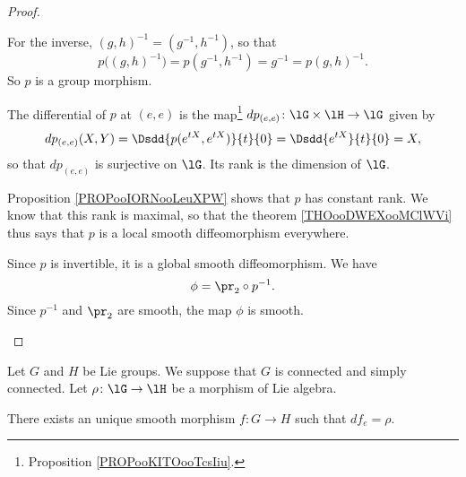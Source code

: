 \begin{proof}
\begin{subproof}
\begin{subproof}
\begin{equation}
			\end{equation}
			For the inverse, \( (g,h)^{-1}=(g^{-1},h^{-1})\), so that
			\begin{equation}
				p\big( (g,h)^{-1}\big)=p(g^{-1},h^{-1})=g^{-1}=p(g,h)^{-1}.
			\end{equation}
			So \( p\) is a group morphism.
		\end{subproof}
		The differential of \( p\) at \( (e,e)\) is the map\footnote{Proposition \ref{PROPooKITOooTcsIiu}.} \( dp_{(e,e)}\colon \lG\times \lH\to \lG\) given by
		\begin{equation}
			dp_{(e,e)}(X,Y)=\Dsdd{ p( e^{tX},  e^{tX}) }{t}{0}=\Dsdd{  e^{tX} }{t}{0}=X,
		\end{equation}
		so that \( dp_{(e,e)}\) is surjective on \( \lG\). Its rank is the dimension of \( \lG\).

		Proposition \ref{PROPooIORNooLeuXPW} shows that \( p\) has constant rank. We know that this rank is maximal, so that the theorem \ref{THOooDWEXooMClWVi} thus says that \( p\) is a local smooth diffeomorphism everywhere.

		Since \( p\) is invertible, it is a global smooth diffeomorphism.
		\spitem[Conclusion]
		We have
		\begin{equation}
			\phi=\pr_2\circ p^{-1}.
		\end{equation}
		Since \( p^{-1}\) and \( \pr_2\) are smooth, the map \( \phi\) is smooth.
	\end{subproof}
\end{proof}

\begin{theorem}       \label{THOooZAEYooXCdxKI}
	Let \( G\) and \( H\) be Lie groups. We suppose that \( G\) is connected and simply connected. Let \( \rho\colon \lG\to \lH\) be a morphism of Lie algebra.

	There exists an unique smooth morphism \( f\colon G\to H\) such that \( df_e=\rho\).
\end{theorem}

